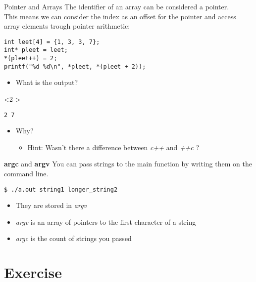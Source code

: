 \begin{frame}[fragile]{Pointer and Arrays}
	The identifier of an array can be considered a pointer.\\
	This means we can consider the index as an offset for the pointer and access array elements trough pointer arithmetic:
	\begin{lstlisting}[numbers=none]
int leet[4] = {1, 3, 3, 7};
int* pleet = leet;
*(pleet++) = 2;
printf("%d %d\n", *pleet, *(pleet + 2));
\end{lstlisting}
	\begin{itemize}
		\item What is the output?
	\end{itemize}
	\begin{uncoverenv}<2->
		\begin{lstlisting}[numbers=none]
2 7
\end{lstlisting}
		\begin{itemize}
			\item Why?
			\begin{itemize}
				\item<3-> Hint: Wasn't there a difference between \textit{c++} and \textit{++c} ?
			\end{itemize}
		\end{itemize}
	\end{uncoverenv}
\end{frame}
\begin{frame}[fragile]{\textbf{argc} and \textbf{argv}}
	You can pass strings to the main function by writing them on the command line.
	\begin{lstlisting}[numbers=none]
$ ./a.out string1 longer_string2
\end{lstlisting}
	\begin{itemize}
		\item They are stored in \textit{argv}
		\item \textit{argv} is an array of pointers to the first character of a string
		\item \textit{argc} is the count of strings you passed
	\end{itemize}
\end{frame}
\section{Exercise}
